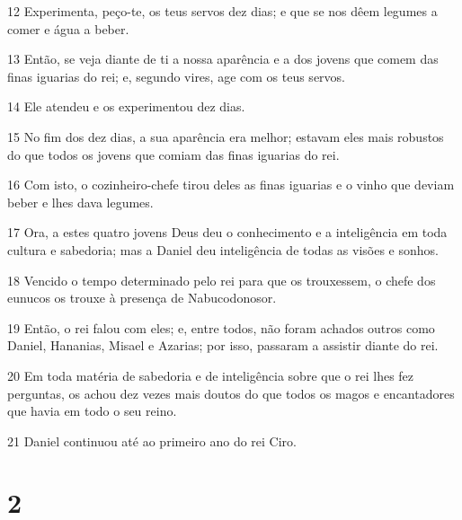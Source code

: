 \par 12 Experimenta, peço-te, os teus servos dez dias; e que se nos dêem legumes a comer e água a beber.
\par 13 Então, se veja diante de ti a nossa aparência e a dos jovens que comem das finas iguarias do rei; e, segundo vires, age com os teus servos.
\par 14 Ele atendeu e os experimentou dez dias.
\par 15 No fim dos dez dias, a sua aparência era melhor; estavam eles mais robustos do que todos os jovens que comiam das finas iguarias do rei.
\par 16 Com isto, o cozinheiro-chefe tirou deles as finas iguarias e o vinho que deviam beber e lhes dava legumes.
\par 17 Ora, a estes quatro jovens Deus deu o conhecimento e a inteligência em toda cultura e sabedoria; mas a Daniel deu inteligência de todas as visões e sonhos.
\par 18 Vencido o tempo determinado pelo rei para que os trouxessem, o chefe dos eunucos os trouxe à presença de Nabucodonosor.
\par 19 Então, o rei falou com eles; e, entre todos, não foram achados outros como Daniel, Hananias, Misael e Azarias; por isso, passaram a assistir diante do rei.
\par 20 Em toda matéria de sabedoria e de inteligência sobre que o rei lhes fez perguntas, os achou dez vezes mais doutos do que todos os magos e encantadores que havia em todo o seu reino.
\par 21 Daniel continuou até ao primeiro ano do rei Ciro.

\chapter{2}

